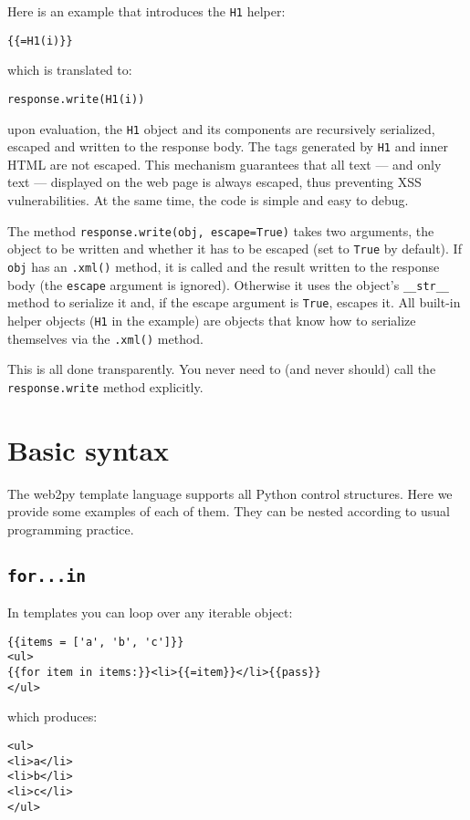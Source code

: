 \documentclass[justified,sixbynine,notoc]{tufte-book}
\def\ft{\small\tt}
\def\inxx#1{\index{#1}}
\begin{document}
\begin{fullwidth}
Here is an example that introduces the {\ft H1} helper:
\begin{lstlisting}[keywords={}]
{{=H1(i)}}
\end{lstlisting}
\noindent which is translated to:
\begin{lstlisting}
response.write(H1(i))
\end{lstlisting}
\noindent upon evaluation, the {\ft H1} object and its components are recursively serialized, escaped and written to the response body. The tags generated by {\ft H1} and inner HTML are not escaped. This mechanism guarantees that all text --- and only text --- displayed on the web page is always escaped, thus preventing XSS vulnerabilities. At the same time, the code is simple and easy to debug.

The method {\ft response.write(obj, escape=True)} takes two arguments, the object to be written and whether it has to be escaped (set to {\ft True} by default). If {\ft obj} has an {\ft .xml()} method, it is called and the result written to the response body (the {\ft escape} argument is ignored). Otherwise it uses the object's {\ft \_\_str\_\_} method to serialize it and, if the escape argument is {\ft True}, escapes it. All built-in helper objects ({\ft H1} in the example) are objects that know how to serialize themselves via the {\ft .xml()} method.

This is all done transparently. You never need to (and never should) call the {\ft response.write} method explicitly.

\goodbreak\section{Basic syntax}

The web2py template language supports all Python control structures. Here we provide some examples of each of them. They can be nested according to usual programming practice.

\goodbreak\subsection{{\ft for...in}}

\inxx{for}

In templates you can loop over any iterable object:
\begin{lstlisting}[keywords={}]
{{items = ['a', 'b', 'c']}}
<ul>
{{for item in items:}}<li>{{=item}}</li>{{pass}}
</ul>
\end{lstlisting}
\noindent which produces:
\begin{lstlisting}[keywords={}]
<ul>
<li>a</li>
<li>b</li>
<li>c</li>
</ul>
\end{lstlisting}


\end{fullwidth}
\end{document}
